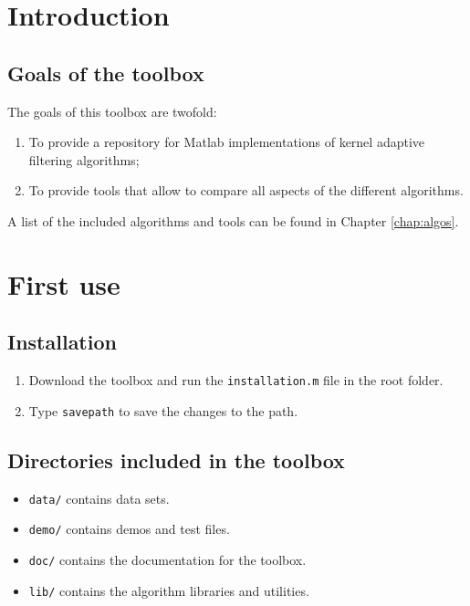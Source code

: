 \documentclass[]{report}
\begin{document}

\tableofcontents

\chapter{Introduction}


\section{Goals of the toolbox}
The goals of this toolbox are twofold:
\begin{enumerate}
\item To provide a repository for Matlab implementations of kernel adaptive filtering algorithms;
\item To provide tools that allow to compare all aspects of the different algorithms.
\end{enumerate}
A list of the included algorithms and tools can be found in Chapter \ref{chap:algos}.


\chapter{First use}

\section{Installation}

\begin{enumerate}
\item Download the toolbox and run the \verb"installation.m" file in the root folder.
\item Type \verb"savepath" to save the changes to the path.
\end{enumerate}

\section{Directories included in the toolbox}

\begin{itemize}
\item \verb"data/" contains data sets.
\item \verb"demo/" contains demos and test files.
\item \verb"doc/" contains the documentation for the toolbox.
\item \verb"lib/" contains the algorithm libraries and utilities.
\end{itemize}
\end{document}
